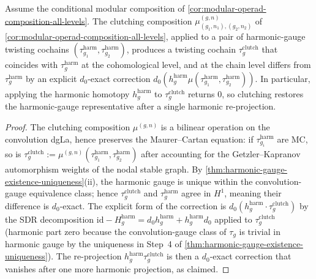 \begin{proposition}
\label{prop:clutching-harmonic-gauge-covariant}
\ClaimStatusConditional
Assume the conditional modular composition of
\autoref{cor:modular-operad-composition-all-levels}.
The clutching composition
\(\mu_{(g_{1}, n_{1}), (g_{2}, n_{2})}^{(g, n)}\) of
\autoref{cor:modular-operad-composition-all-levels}, applied to a
pair of harmonic-gauge twisting cochains
\((\tau_{g_{1}}^{\mathrm{harm}}, \tau_{g_{2}}^{\mathrm{harm}})\),
produces a twisting cochain
\(\tau_{g}^{\mathrm{clutch}}\) that coincides with
\(\tau_{g}^{\mathrm{harm}}\) at the cohomological level, and at the
chain level differs from \(\tau_{g}^{\mathrm{harm}}\) by an explicit
\(d_{0}\)-exact correction
\(d_{0}(h^{\mathrm{harm}}_{g} \mu(\tau_{g_{1}}^{\mathrm{harm}},
\tau_{g_{2}}^{\mathrm{harm}}))\). In particular, applying the
harmonic homotopy \(h^{\mathrm{harm}}_{g}\) to
\(\tau_{g}^{\mathrm{clutch}}\) returns \(0\), so clutching restores
the harmonic-gauge representative after a single harmonic
re-projection.
\end{proposition}

\begin{proof}
The clutching composition \(\mu^{(g, n)}\) is a bilinear operation
on the convolution dgLa, hence preserves the Maurer--Cartan
equation: if \(\tau_{g_{i}}^{\mathrm{harm}}\) are MC, so is
\(\tau_{g}^{\mathrm{clutch}} :=
\mu^{(g, n)}(\tau_{g_{1}}^{\mathrm{harm}},
\tau_{g_{2}}^{\mathrm{harm}})\) after accounting for the
Getzler--Kapranov automorphism weights of the nodal stable graph.
By \autoref{thm:harmonic-gauge-existence-uniqueness}(ii), the
harmonic gauge is unique within the convolution-gauge equivalence
class; hence \(\tau_{g}^{\mathrm{clutch}}\) and
\(\tau_{g}^{\mathrm{harm}}\) agree in \(H^{1}\), meaning their
difference is \(d_{0}\)-exact. The explicit form of the correction
is \(d_{0}(h^{\mathrm{harm}}_{g} \cdot \tau_{g}^{\mathrm{clutch}})\)
by the SDR decomposition
\(\mathrm{id} - H^{\mathrm{harm}}_{g}
= d_{0} h^{\mathrm{harm}}_{g}
+ h^{\mathrm{harm}}_{g} d_{0}\) applied to
\(\tau_{g}^{\mathrm{clutch}}\) (harmonic part zero because the
convolution-gauge class of \(\tau_{g}\) is trivial in harmonic
gauge by the uniqueness in Step~4 of
\autoref{thm:harmonic-gauge-existence-uniqueness}). The
re-projection \(h^{\mathrm{harm}}_{g} \tau_{g}^{\mathrm{clutch}}\)
is then a \(d_{0}\)-exact correction that vanishes after one more
harmonic projection, as claimed.
\end{proof}

